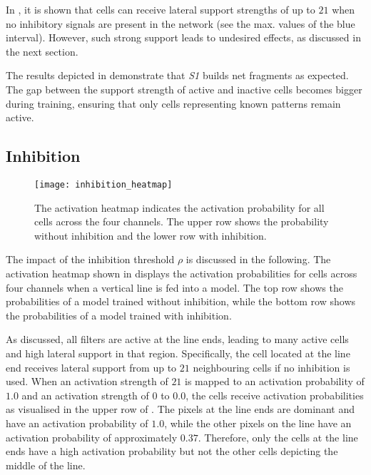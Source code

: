 In , it is shown that cells can receive lateral support strengths of up to $21$ when no inhibitory signals are present in the network (see the max. values of the blue interval).
However, such strong support leads to undesired effects, as discussed in the next section.

The results depicted in  demonstrate that \emph{S1} builds net fragments as expected. The gap between the support strength of active and inactive cells becomes bigger during training, ensuring that only cells representing known patterns remain active.

\subsection{Inhibition}
%
\begin{figure}[h]
    \centering
    \texttt{[image: inhibition\_heatmap]}
    \caption[Activation heatmap with and without inhibition]{The activation heatmap indicates the activation probability for all cells across the four channels. The upper row shows the probability without inhibition and the lower row with inhibition.}
\end{figure}
%
The impact of the inhibition threshold $\rho$ is discussed in the following. The activation heatmap shown in  displays the activation probabilities for cells across four channels when a vertical line is fed into a model.
The top row shows the probabilities of a model trained without inhibition, while the bottom row shows the probabilities of a model trained with inhibition.

As discussed, all filters are active at the line ends, leading to many active cells and high lateral support in that region.
Specifically, the cell located at the line end receives lateral support from up to $21$ neighbouring cells if no inhibition is used.
When an activation strength of $21$ is mapped to an activation probability of $1.0$ and an activation strength of $0$ to $0.0$, the cells receive activation probabilities as visualised in the upper row of .
The pixels at the line ends are dominant and have an activation probability of $1.0$, while the other pixels on the line have an activation probability of approximately $0.37$.
Therefore, only the cells at the line ends have a high activation probability but not the other cells depicting the middle of the line.

